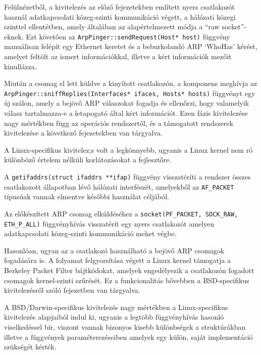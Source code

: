 \documentclass[a4paper,12pt]{article}
\newcounter{subsubsubsection}[subsubsection]
\begin{document}
	Felülnézetből, a kivitelezés az előző fejezetekben említett nyers csatlakozót használ adatkapcsolati közeg-szinti kommunikáció végett, a hálózati közegi szinttel ellentétben, amely általában az alapértelmezett módja a ``raw socket''-eknek. Ezt követően az \texttt{ArpPinger::sendRequest(Host* host)} függvény manuálisan felépít egy Ethernet keretet és a beburkolandó ARP `WhoHas' kérést, amelyet feltölt az ismert információkkal, illetve a kért információk mezőit kinullázza.
	
	Miután a csomag el lett küldve a kinyított csatlakozón, a komponens meghívja az \texttt{ArpPinger::sniffReplies(Interfaces* ifaces, Hosts* hosts)} függvényt egy új szálon, amely a bejövő ARP válaszokat fogadja és ellenőrzi, hogy valamelyik válasz tartalmazza-e a letapogató által kért információt. Ezen fázis kivitelezése nagy mértékben függ az operációs rendszertől, és a támogatott rendszerek kivitelezése a következő fejezetekben van tárgyalva.


	A Linux-specifikus kivitelez;s volt a legkönnyebb, ugyanis a Linux kernel nem ró különböző értelem nélküli korlátozásokat a fejlesztőre.
	
	A \texttt{getifaddrs(struct ifaddrs **ifap)} függvény visszatéríti a rendszer összes csatlakozott állapotban lévő hálózati interfészét, amelyekből az \texttt{AF_PACKET} típusúak vannak elmentve későbbi használat céljából.

	Az előkészített ARP csomag elküldéséhez a \texttt{socket(PF_PACKET, SOCK_RAW, ETH_P_ALL)} függvényhívás visszatérít egy nyers csatlakozót amelyen adatkapcsolati közeg-szinti kommunikáció mehet végbe.
	
	Hasonlóan, ugyan az a csatlakozó használható a bejövő ARP csomagok fogadására is. A folyamat felgyorsítása végett a Linux kernel támogatja a Berkeley Packet Filter bájtkódokat, amelyek engedélyezik a csatlakozón fogadott csomagok kernel-szinti szűrését. Ez a funkcionalitás bővebben a BSD-specifikus kivitelezésről szóló fejezetben van tárgyalva.


	A BSD/Darwin-specifikus kivitelezés nagy mértékben a Linux-specifikus kivitelezés alapjaiból indul ki, ugyanis a legtöbb függvényhívás hasonló viselkedéssel bír, viszont vannak bizonyos kisebb különbségek a struktúrákban illetve a függvények paraméterezéseiben amelyek egy külön, saját implementáció szükségét kérték.
\end{document}
